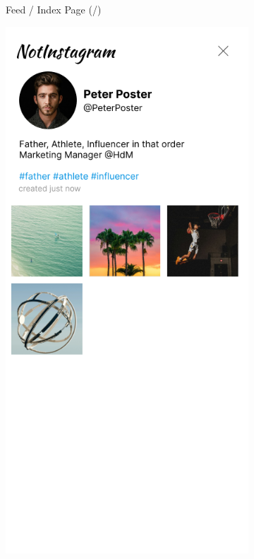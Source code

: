 \documentclass[a4paper, 12pt]{article}
\begin{document}
\begin{figure}[ht!]
\begin{subfigure}{0.49\linewidth}
\begin{center}
    \end{center}
    \caption{Feed / Index Page (/)}\label{subfig:index}
  \end{subfigure}
  \begin{subfigure}{0.49\linewidth}
    \begin{center}
      \includegraphics[width=\linewidth, height=0.3\textheight, keepaspectratio,frame]{img/ig-clone/Profil.png}

\end{center}
\end{subfigure}
\end{figure}
\end{document}
